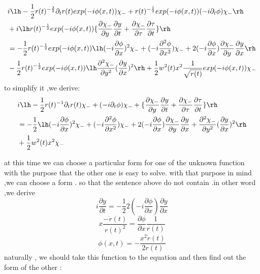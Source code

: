 \begin{frame}
\begin{align*}
&i\lh-\frac{1}{2}r(t)^{-\frac{3}{2}}\partial_t r(t)exp(-i\phi(x,t))\chi_-+r(t)^{-\frac{1}{2}}exp(-i\phi(x,t))(-i\partial_t \phi)\chi_-\rh\\
&+i\lh r(t)^{-\frac{1}{2}}exp(-i\phi(x,t))\{\frac{\partial\chi_-}{\partial y}\frac{\partial y}{\partial t}+\frac{\partial\chi_-}{\partial \tau}\frac{\partial\tau}{\partial t}\}\rh\\
&=-\frac{1}{2}r(t)^{-\frac{1}{2}}exp(-i\phi(x,t))\lh(-i\frac{\partial\phi}{\partial x})^2\chi_-+(-i\frac{\partial^2\phi}{\partial x^2})\chi_-+2(-i\frac{\partial\phi}{\partial x})\frac{\partial\chi_-}{\partial y}\frac{\partial y}{\partial x}\rh\\
&-\frac{1}{2}r(t)^{-\frac{1}{2}}exp(-i\phi(x,t))\lh\frac{\partial^2\chi_-}{\partial y^2}(\frac{\partial y}{\partial x})^2\rh+\frac{1}{2}w^2(t)x^2\frac{1}{\sqrt{r(t)}}exp(-i\phi(x,t))\chi_-
\end{align*}
to simplify it ,we derive:
\begin{align*}
&i\lh-\frac{1}{2}r(t)^{-1}\partial_t r(t)\chi_-+(-i\partial_t \phi)\chi_-+\{\frac{\partial\chi_-}{\partial y}\frac{\partial y}{\partial t}+\frac{\partial\chi_-}{\partial \tau}\frac{\partial\tau}{\partial t}\}\rh\notag\\
&=-\frac{1}{2}\lh(-i\frac{\partial\phi}{\partial x})^2\chi_-+(-i\frac{\partial^2\phi}{\partial x^2})\chi_-+2(-i\frac{\partial\phi}{\partial x})\frac{\partial\chi_-}{\partial y}\frac{\partial y}{\partial x}+\frac{\partial^2\chi_-}{\partial y^2}(\frac{\partial y}{\partial x})^2\rh\notag\\
&+\frac{1}{2}w^2(t)x^2\chi_-\label{eq:phichi}
\end{align*}
\end{frame}
\begin{frame}
at this time we can choose a particular form for one of the unknown function with the purpose that the other one is easy to solve. 
with that purpose in mind ,we can choose a form . so that the sentence above do not contain .in other word ,we derive
\[i\frac{\partial y}{\partial t}=-\frac{1}{2}2(-i\frac{\partial\phi}{\partial x})\frac{\partial y}{\partial x}\]
\[ x\frac{-\dot{r}(t)}{r(t)^2}=\frac{\partial\phi}{\partial x}\frac{1}{r(t)}\]
\[\phi(x,t)=-\frac{x^2\dot{r}(t)}{2r(t)}\]
naturally , we should take this function to the equation and then find out the form of  the other :
\end{frame}
